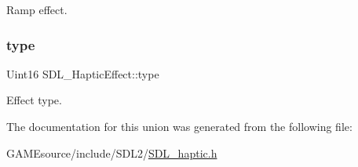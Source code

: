 Ramp effect. \mbox{\label{union_s_d_l___haptic_effect_a5ff6cfd8da91537091e9a6c2108cb179}} 
\subsubsection{\texorpdfstring{type}{type}}
{\footnotesize\ttfamily Uint16 S\+D\+L\+\_\+\+Haptic\+Effect\+::type}

Effect type. 

The documentation for this union was generated from the following file\+:\begin{DoxyCompactItemize}
\item 
G\+A\+M\+Esource/include/\+S\+D\+L2/\mbox{\hyperlink{_s_d_l__haptic_8h}{S\+D\+L\+\_\+haptic.\+h}}\end{DoxyCompactItemize}
